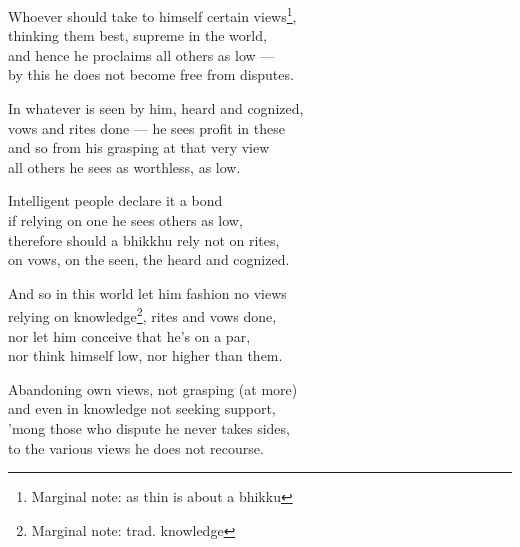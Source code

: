 \begin{MyDescription}{}
Whoever should take to himself certain views\footnote{Marginal note: as thin is about a bhikku},\\
thinking them best, supreme in the world,\\
and hence he proclaims all others as low —\\
by this he does not become free from disputes.
\end{MyDescription}

\begin{MyDescription}{}
In whatever is seen by him, heard and cognized,\\
vows and rites done — he sees profit in these\\
and so from his grasping at that very view\\
all others he sees as worthless, as low.
\end{MyDescription}

\begin{MyDescription}{}
Intelligent people declare it a bond\\
if relying on one he sees others as low,\\
therefore should a bhikkhu rely not on rites,\\
on vows, on the seen, the heard and cognized.
\end{MyDescription}

\begin{MyDescription}{}
And so in this world let him fashion no views\\
relying on knowledge\footnote{Marginal note: trad. knowledge}, rites and vows done,\\
nor let him conceive that he's on a par,\\
nor think himself low, nor higher than them.
\end{MyDescription}

\begin{MyDescription}{}
Abandoning own views, not grasping (at more)\\
and even in knowledge not seeking support,\\
'mong those who dispute he never takes sides,\\
to the various views he does not recourse.
\end{MyDescription}

